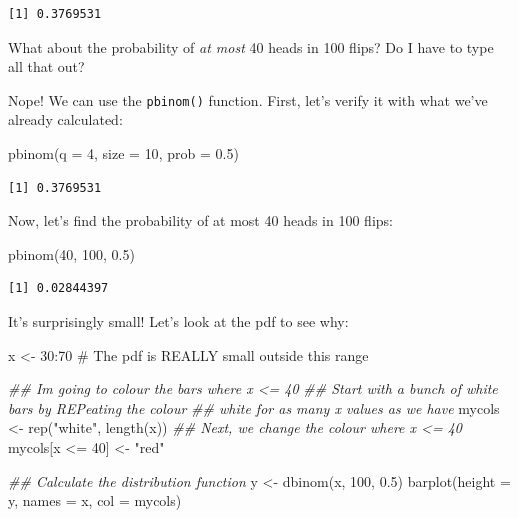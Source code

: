 \documentclass[
  letterpaper,
  DIV=11,
  numbers=noendperiod,
  oneside]{scrreprt}
\newenvironment{Shaded}{\begin{snugshade}}{\end{snugshade}}
\newcommand{\AttributeTok}[1]{\textcolor[rgb]{0.40,0.45,0.13}{#1}}
\newcommand{\CommentTok}[1]{\textcolor[rgb]{0.37,0.37,0.37}{#1}}
\newcommand{\DecValTok}[1]{\textcolor[rgb]{0.68,0.00,0.00}{#1}}
\newcommand{\DocumentationTok}[1]{\textcolor[rgb]{0.37,0.37,0.37}{\textit{#1}}}
\newcommand{\FloatTok}[1]{\textcolor[rgb]{0.68,0.00,0.00}{#1}}
\newcommand{\FunctionTok}[1]{\textcolor[rgb]{0.28,0.35,0.67}{#1}}
\newcommand{\NormalTok}[1]{\textcolor[rgb]{0.00,0.23,0.31}{#1}}
\newcommand{\OtherTok}[1]{\textcolor[rgb]{0.00,0.23,0.31}{#1}}
\newcommand{\SpecialCharTok}[1]{\textcolor[rgb]{0.37,0.37,0.37}{#1}}
\newcommand{\StringTok}[1]{\textcolor[rgb]{0.13,0.47,0.30}{#1}}
\begin{document}
\begin{verbatim}
[1] 0.3769531
\end{verbatim}

What about the probability of \emph{at most} 40 heads in 100 flips? Do I
have to type all that out?

Nope! We can use the \texttt{pbinom()} function. First, let's verify it
with what we've already calculated:

\begin{Shaded}
\begin{Highlighting}[]
\FunctionTok{pbinom}\NormalTok{(}\AttributeTok{q =} \DecValTok{4}\NormalTok{, }\AttributeTok{size =} \DecValTok{10}\NormalTok{, }\AttributeTok{prob =} \FloatTok{0.5}\NormalTok{)}
\end{Highlighting}
\end{Shaded}

\begin{verbatim}
[1] 0.3769531
\end{verbatim}

Now, let's find the probability of at most 40 heads in 100 flips:

\begin{Shaded}
\begin{Highlighting}[]
\FunctionTok{pbinom}\NormalTok{(}\DecValTok{40}\NormalTok{, }\DecValTok{100}\NormalTok{, }\FloatTok{0.5}\NormalTok{)}
\end{Highlighting}
\end{Shaded}

\begin{verbatim}
[1] 0.02844397
\end{verbatim}

It's surprisingly small! Let's look at the pdf to see why:

\begin{Shaded}
\begin{Highlighting}[]
\NormalTok{x }\OtherTok{\textless{}{-}} \DecValTok{30}\SpecialCharTok{:}\DecValTok{70} \CommentTok{\# The pdf is REALLY small outside this range}

\DocumentationTok{\#\# I\textquotesingle{}m going to colour the bars where x \textless{}= 40}
\DocumentationTok{\#\# Start with a bunch of white bars by REPeating the colour}
\DocumentationTok{\#\# white for as many x values as we have}
\NormalTok{mycols }\OtherTok{\textless{}{-}} \FunctionTok{rep}\NormalTok{(}\StringTok{"white"}\NormalTok{, }\FunctionTok{length}\NormalTok{(x))}
\DocumentationTok{\#\# Next, we change the colour where x \textless{}= 40}
\NormalTok{mycols[x }\SpecialCharTok{\textless{}=} \DecValTok{40}\NormalTok{] }\OtherTok{\textless{}{-}} \StringTok{"red"}

\DocumentationTok{\#\# Calculate the distribution function}
\NormalTok{y }\OtherTok{\textless{}{-}} \FunctionTok{dbinom}\NormalTok{(x, }\DecValTok{100}\NormalTok{, }\FloatTok{0.5}\NormalTok{)}
\FunctionTok{barplot}\NormalTok{(}\AttributeTok{height =}\NormalTok{ y, }\AttributeTok{names =}\NormalTok{ x, }\AttributeTok{col =}\NormalTok{ mycols)}
\end{Highlighting}
\end{Shaded}
\end{document}
